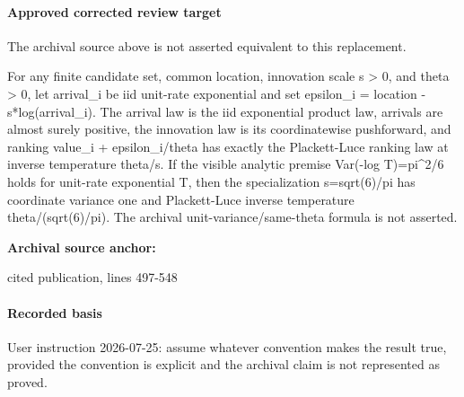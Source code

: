 \documentclass[10pt]{article}
\begin{document}
\paragraph{Approved corrected review target}
The archival source above is not asserted equivalent to this replacement.
\begin{ReviewVerbatim}
For any finite candidate set, common location, innovation scale s > 0, and theta > 0, let arrival_i be iid unit-rate exponential and set epsilon_i = location - s*log(arrival_i). The arrival law is the iid exponential product law, arrivals are almost surely positive, the innovation law is its coordinatewise pushforward, and ranking value_i + epsilon_i/theta has exactly the Plackett-Luce ranking law at inverse temperature theta/s. If the visible analytic premise Var(-log T)=pi^2/6 holds for unit-rate exponential T, then the specialization s=sqrt(6)/pi has coordinate variance one and Plackett-Luce inverse temperature theta/(sqrt(6)/pi). The archival unit-variance/same-theta formula is not asserted.
\end{ReviewVerbatim}

\textbf{Archival source anchor:} {\footnotesize\raggedright cited publication, lines 497-\allowbreak{}548\par}
\paragraph{Recorded basis}
User instruction 2026-\allowbreak{}07-\allowbreak{}25:\allowbreak{} assume whatever convention makes the result true, provided the convention is explicit and the archival claim is not represented as proved.\allowbreak{}
\end{document}

